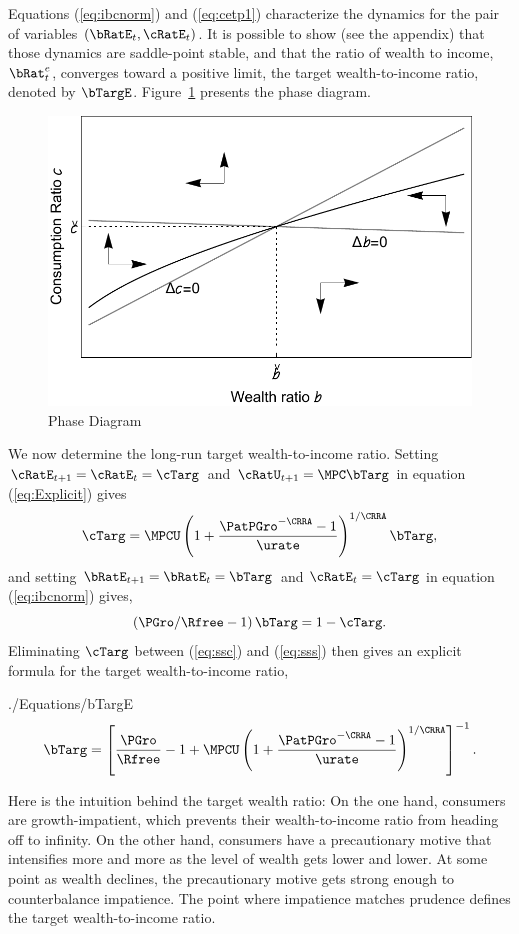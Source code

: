 \documentclass[titlepage]{\econtex}\newcommand{\texname}{cjSOE}
\begin{document}
Equations (\ref{eq:ibcnorm}) and (\ref{eq:cetp1}) characterize the dynamics for the pair of variables $(\bRatE_{t}, \cRatE_t)$. It is possible to show (see the appendix) that those dynamics are saddle-point stable, and that the ratio of wealth to income, $\bRat^e_t$, converges toward a positive limit, the target wealth-to-income ratio, denoted by $\bTargE$.
Figure~\ref{fig:phaseDiag} presents the phase diagram.

\begin{figure}
\includegraphics{./Figures/phaseDiag}
\caption{Phase Diagram}\label{fig:phaseDiag}
\end{figure}

We now determine the long-run target wealth-to-income ratio. Setting $\cRatE_{t+1}=\cRatE_t=\cTarg$ and $\cRatU_{t+1}=\MPC \bTarg$ in equation (\ref{eq:Explicit}) gives
\begin{equation}
\cTarg = \MPCU \left(1+\frac{\PatPGro^{-\CRRA}-1}{\urate}\right)^{1/\CRRA} \bTarg,
\label{eq:ssc}
\end{equation}
and setting $\bRatE_{t+1}=\bRatE_t=\bTarg$ and $\cRatE_t=\cTarg$ in equation (\ref{eq:ibcnorm}) gives,
\begin{equation}
\left(\PGro/\Rfree-1 \right) \bTarg = 1 -\cTarg. \label{eq:sss}
\end{equation}
Eliminating $\cTarg$ between (\ref{eq:ssc}) and (\ref{eq:sss}) then gives an explicit formula for the target wealth-to-income ratio,
\begin{verbatimwrite}{./Equations/bTargE}
\begin{equation}
 \bTarg= \left[\frac{\PGro}{\Rfree}-1+\MPCU \left(1+\frac{\PatPGro^{-\CRRA}-1}{\urate}\right)^{1/\CRRA}\right]^{-1}.
\label{eq:bTargE}
\end{equation}
\end{verbatimwrite}

Here is the intuition behind the target wealth ratio:  On the one hand,
consumers are growth-impatient, which prevents their wealth-to-income ratio
from heading off to infinity.  On the other hand, consumers have
a precautionary motive that intensifies more and more as the level of
wealth gets lower and lower.  At some point as wealth declines, the precautionary motive
gets strong enough to counterbalance impatience.  The point where impatience matches prudence defines the target wealth-to-income ratio.
\end{document}
